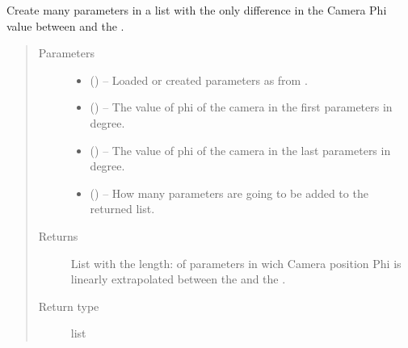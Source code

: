 \documentclass[letterpaper,10pt,english]{sphinxmanual}
\begin{document}
\begin{fulllineitems}
\begin{fulllineitems}
\label{\detokenize{index:dataset.dataset_cuboids.change_apperence_camera_phi}}
Create many parameters in a list with the only difference in the Camera Phi value between  and the .
\begin{quote}\begin{description}
\item[{Parameters}] \leavevmode\begin{itemize}
\item {} 
 () -- Loaded or created parameters as from {\hyperref[\detokenize{index:dataset.dataset_cuboids.create_random_parameters}]{}}.

\item {} 
 () -- The value of phi of the camera in the first parameters in degree.

\item {} 
 () -- The value of phi of the camera in the last parameters in degree.

\item {} 
 () -- How many parameters are going to be added to the returned list.

\end{itemize}

\item[{Returns}] \leavevmode
List with the length:  of parameters in wich Camera position Phi is linearly extrapolated between the  and the .

\item[{Return type}] \leavevmode
list

\end{description}\end{quote}


\end{fulllineitems}
\end{fulllineitems}
\end{document}
